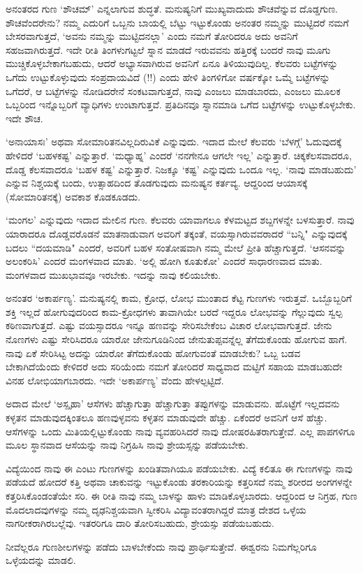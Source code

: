 ಅನಂತರದ ಗುಣ `ಶೌಚಮ್' ಎನ್ನಲಾಗುವ ಶುದ್ಧತೆ. ಮನುಷ್ಯನಿಗೆ ಮುಖ್ಯವಾದುದು ಶೌಚವೆನ್ನುವ ದೊಡ್ಡಗುಣ. ಶೌಚವೆಂದರೇನು? ನಮ್ಮ ಎದುರಿಗೆ 
ಒಬ್ಬನು ಬಾಯಲ್ಲಿ ಬೆಟ್ಟು ಇಟ್ಟುಕೊಂಡು ಅನಂತರ ನಮ್ಮನ್ನು ಮುಟ್ಟಿದರೆ ನಮಗೆ ಬೇಸರವಾಗುತ್ತದೆ, `ಅವನು ನಮ್ಮನ್ನು ಮುಟ್ಟಿದನಲ್ಲಾ' 
ಎಂದು ನಮಗೆ ತೋರಿದರೂ ಅದು ಅವನಿಗೆ ಸಹಜವಾಗಿರುತ್ತದೆ. ಇದೇ ರೀತಿ ತಿಂಗಳುಗಟ್ಟಲೆ ಸ್ನಾನ ಮಾಡದೆ ಇರುವವನು ಹತ್ತಿರಕ್ಕೆ ಬಂದರೆ ನಾವು 
ಮೂಗು ಮುಚ್ಚಿಕೊಳ್ಳಬೇಕಾಗಬಹುದು, ಆದರೆ ಅಭ್ಯಾಸವಾಗಿರುವ ಅವನಿಗೆ ಏನೂ ತಿಳಿಯುವುದಿಲ್ಲ. ಕೆಲವರು ಬಟ್ಟೆಗಳನ್ನು ಒಗೆದು ಉಟ್ಟುಕೊಳ್ಳುವುದು 
ಸಂಪ್ರದಾಯವಿದೆ (!!) ಎಂದು ಹೇಳಿ ತಿಂಗಳಿಗೋ ವರ್ಷಕ್ಕೋ ಒಮ್ಮೆ ಬಟ್ಟೆಗಳನ್ನು ಒಗೆದರೆ, ಆ ಬಟ್ಟೆಗಳನ್ನು ನೋಡಿದರೇನೆ ಸಂಕಟವಾಗುತ್ತದೆ, ನಾವು ಎಂಜಲು 
ಮಾಡಬಾರದು, ಎಂಜಲು ಮೂಲಕ ಒಬ್ಬರಿಂದ ಇನ್ನೊಬ್ಬರಿಗೆ ವ್ಯಾಧಿಗಳು ಉಂಟಾಗುತ್ತವೆ. ಪ್ರತಿದಿನವೂ ಸ್ನಾನಮಾಡಿ ಒಗೆದ ಬಟ್ಟೆಗಳನ್ನು ಉಟ್ಟುಕೊಳ್ಳಬೇಕು. ಇದೇ ಶೌಚ.

`ಅನಾಯಾಸಃ' ಅಥವಾ ಸೋಮಾರಿತನವಿಲ್ಲದಿರುವಿಕೆ ಎನ್ನುವುದು. ಇದಾದ ಮೇಲೆ ಕೆಲವರು `ಬೆಳಗ್ಗೆ' ಓದುವುದಕ್ಕೆ ಹೇಳಿದರೆ `ಬಹಳಕಷ್ಟ' ಎನ್ನುತ್ತಾರೆ. 
`ಮಧ್ಯಾಹ್ನ' ಎಂದರೆ `ನನಗೇನೂ ಆಗಲೇ ಇಲ್ಲ' ಎನ್ನುತ್ತಾರೆ. ಚಿಕ್ಕಕೆಲಸವಾದರೂ, ದೊಡ್ಡ ಕೆಲಸವಾದರೂ `ಬಹಳ ಕಷ್ಟ' ಎನ್ನುತ್ತಾರೆ. ನಿಜಕ್ಕೂ `ಕಷ್ಟ' ಎನ್ನುವುದು ಒಂದೂ ಇಲ್ಲ. `ನಾವು 
ಮಾಡಬಹುದು' ಎನ್ನುವ ನಿಶ್ಚಯಕ್ಕೆ ಬಂದು, ಉತ್ಸಾಹದಿಂದ ತೊಡಗುವುದು ಮನುಷ್ಯನ ಕರ್ತವ್ಯ. ಆದ್ದರಿಂದ ಆಯಾಸಕ್ಕೆ  (ಸೋಮಾರಿತನಕ್ಕೆ) ಅವಕಾಶ ಕೊಡಕೂಡದು.

`ಮಂಗಲ' ಎನ್ನುವುದು ಇದಾದ ಮೇಲಿನ ಗುಣ. ಕೆಲವರು ಯಾವಾಗಲೂ ಕೆಳಮಟ್ಟದ ಶಬ್ದಗಳನ್ನೇ ಬಳಸುತ್ತಾರೆ. ನಾವು ಯಾರಾದರೂ ದೊಡ್ಡವರೊಡನೆ ಮಾತನಾಡುವಾಗ 
ಅವರಿಗೆ ತಕ್ಕಂತೆ, ವಯಸ್ಸಾಗಿರುವವರಾದರೆ ``ಬನ್ನಿ" ಎನ್ನುವುದಕ್ಕೆ ಬದಲು ``ದಯಮಾಡಿ" ಎಂದರೆ, ಅವರಿಗೆ ಬಹಳ ಸಂತೋಷವಾಗಿ ನಮ್ಮ ಮೇಲೆ ಪ್ರೀತಿ ಹೆಚ್ಚಾಗುತ್ತದೆ. 
`ಆಸನವನ್ನು ಅಲಂಕರಿಸಿ' ಎಂದರೆ ಮಂಗಳವಾದ ಮಾತು. `ಅಲ್ಲಿ ಹೋಗಿ ಕೂತುಕೋ' ಎಂದರೆ ಸಾಧಾರಣವಾದ ಮಾತು. ಮಂಗಳವಾದ ಮುಖಭಾವವೂ ಇರಬೇಕು. ಇದನ್ನು ನಾವು ಕಲಿಯಬೇಕು.

ಅನಂತರ `ಅಕಾರ್ಪಣ್ಯ'. ಮನುಷ್ಯನಲ್ಲಿ ಕಾಮ, ಕ್ರೋಧ, ಲೋಭ ಮುಂತಾದ ಕೆಟ್ಟ ಗುಣಗಳು ಇರುತ್ತವೆ. ಒಬ್ಬೊಬ್ಬರಿಗೆ ಶಕ್ತಿ ಇಲ್ಲದೆ ಹೋಗುವುದರಿಂದ 
ಕಾಮ-ಕ್ರೋಧಗಳು ತಾವಾಗಿಯೇ ಬರದೆ ಇದ್ದರೂ ಲೋಭವನ್ನು ಗೆಲ್ಲುವುದು ಸ್ವಲ್ಪ ಕಠಿಣವಾಗುತ್ತದೆ. ಎಷ್ಟು ವಯಸ್ಸಾದರೂ ಇನ್ನೂ ಹಣವನ್ನು 
ಸೇರಿಸಬೇಕೆಂಬ ವಿಚಾರ ಲೋಭವಾಗುತ್ತದೆ. ಜೇನು ನೊಣಗಳು ಎಷ್ಟು ಸೇರಿಸಿದರೂ ಯಾರೋ ಜೇನುಗೂಡಿನಿಂದ ಜೇನುತುಪ್ಪವನ್ನೆಲ್ಲ 
ತೆಗೆದುಕೊಂಡು ಹೋಗುವ ಹಾಗೆ. ನಾವು ಏಕೆ ಸೇರಿಸಿಟ್ಟ ಅದನ್ನು ಯಾರೋ ತೆಗೆದುಕೊಂಡು ಹೋಗುವಂತೆ ಮಾಡಬೇಕು? ಒಬ್ಬ ಬಡವ 
ಬೇಕಾಗಿದೆಯೆಂದು ಕೇಳಿದರೆ ಅದು ಸರಿಯೆಂದು ನಮಗೆ ತೋರಿದರೆ ಸಾಧ್ಯವಾದ ಮಟ್ಟಿಗೆ ಸಹಾಯ ಮಾಡಬಹುದೇ ವಿನಹ ಲೋಭಿಯಾಗಬಾರದು. ಇದೇ `ಅಕಾರ್ಪಣ್ಯ' ವೆಂದು ಹೇಳಲ್ಪಟ್ಟಿದೆ.

ಅದಾದ ಮೇಲೆ `ಅಸ್ಪೃಹಾ' ಆಸೆಗಳು ಹೆಚ್ಚಾಗುತ್ತಾ ಹೆಚ್ಚಾಗುತ್ತಾ ತಪ್ಪುಗಳನ್ನು ಮಾಡುವನು. ಹೊಟ್ಟೆಗೆ ಇಲ್ಲದವನು ಕಳ್ಳತನ ಮಾಡುವುದಕ್ಕಿಂತಲೂ 
ಹಣವುಳ್ಳವನು ಕಳ್ಳತನ ಮಾಡುವುದೇ ಹೆಚ್ಚು. ಏಕೆಂದರೆ ಅವನಿಗೆ ಆಸೆ ಹೆಚ್ಚು. ಆಸೆಗಳನ್ನು ಒಂದು ಮಿತಿಯಲ್ಲಿಟ್ಟುಕೊಂಡು ನಾವು ವ್ಯವಹರಿಸಿದರೆ ನಾವು 
ದೋಷರಹಿತರಾಗುತ್ತೇವೆ. ಎಲ್ಲ ಪಾಪಗಳಿಗೂ ಮೂಲ ಸ್ಥಾನವಾದ ಆಸೆಯನ್ನು ನಾವು ನಿಗ್ರಹಿಸಿ ನಾವು ಶ್ರೇಯಸ್ಸನ್ನು ಪಡೆಯಬೇಕು.

ವಿದ್ಯೆಯಿಂದ ನಾವು ಈ ಎಂಟು ಗುಣಗಳನ್ನು ಖಂಡಿತವಾಗಿಯೂ ಪಡೆಯಬೇಕು. ವಿದ್ಯೆ ಕಲಿತೂ ಈ ಗುಣಗಳನ್ನು ನಾವು ಪಡೆಯದೆ ಹೋದರೆ ಕತ್ತಿ ಅಥವಾ 
ಚಾಕುವನ್ನು ಇಟ್ಟುಕೊಂಡು ತರಕಾರಿಯನ್ನು ಕತ್ತರಿಸದೆ ನಮ್ಮ ಶರೀರದ ಅಂಗಗಳನ್ನೇ ಕತ್ತರಿಸಿಕೊಂಡಂತೆಯೇ ಸರಿ. ಈ ರೀತಿ ನಾವು ನಮ್ಮ ಬಾಳನ್ನು 
ಹಾಳು ಮಾಡಿಕೊಳ್ಳಬಾರದು. ಆದ್ದರಿಂದ ಆ ನಿಗ್ರಹ, ಗುಣ ಮೊದಲಾದವುಗಳನ್ನು ನಮ್ಮ ದೃಢನಿಶ್ಚಯವಾಗಿ ಸ್ವೀಕರಿಸಿ ವಿದ್ಯಾವಂತರಾಗಿದ್ದರೆ ಮಾತ್ರ 
ದೇಶದ ಒಳ್ಳೆಯ ನಾಗರೀಕರಾಗಿರಬಲ್ಲೆವು. ಇತರರಿಗೂ ದಾರಿ ತೋರಿಸಬಹುದು, ಶ್ರೇಯಸ್ಸು ಪಡೆಯಬಹುದು.

ನೀವೆಲ್ಲರೂ ಗುಣಶೀಲಗಳನ್ನು ಪಡೆದು ಬಾಳಬೇಕೆಂದು ನಾವು ಪ್ರಾರ್ಥಿಸುತ್ತೇವೆ. ಈಶ್ವರನು ನಿಮಗೆಲ್ಲರಿಗೂ ಒಳ್ಳೆಯದನ್ನು ಮಾಡಲಿ. 

 

